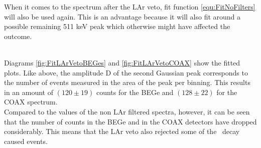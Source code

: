 \documentclass[encoding=utf8,british]{tumphthesis}
\begin{document}
When it comes to the spectrum after the LAr veto, fit function \ref{equ:FitNoFilters} will also be used again.
This is an advantage because it will also fit around a possible remaining 511 keV peak which otherwise might have affected the outcome.

\\

Diagrams \ref{fig:FitLArVetoBEGes} and \ref{fig:FitLArVetoCOAX} show the fitted plots.
Like above, the amplitude D of the second Gaussian peak corresponds to the number of events measured in the area of the peak per binning.
This results in an amount of $(120\pm19)$ counts for the BEGe and $(128\pm22)$ for the COAX spectrum.
\\

Compared to the values of the non LAr filtered spectra, however, it can be seen that the number of counts in the BEGe and in the COAX detectors have dropped considerably.
This means that the LAr veto also rejected some of the \Kr\ decay caused events.
\\
\end{document}

